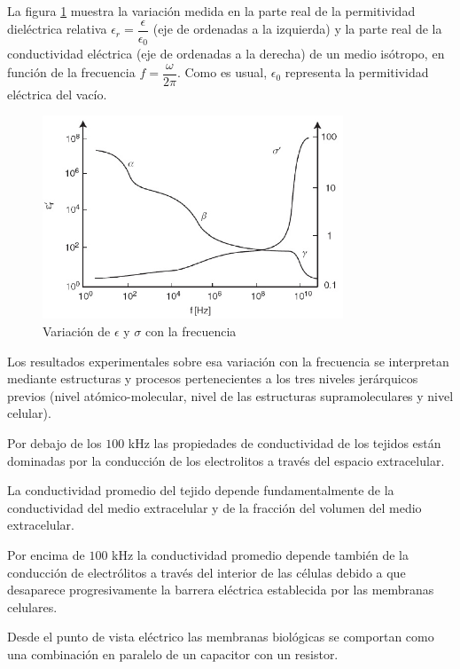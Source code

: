 La figura \ref{fig:65} muestra la variación medida en la parte real de la permitividad dieléctrica relativa $\epsilon_{r}=\dfrac{\epsilon}{\epsilon_{0}}$ (eje de ordenadas a la izquierda) y la parte real de la conductividad eléctrica (eje de ordenadas a la derecha) de un medio isótropo, en función de la frecuencia $f=\dfrac{\omega}{2\pi}$. Como es usual, $\epsilon_{0}$ representa la permitividad eléctrica del vacío.

\begin{figure}[H]
    \centering
    \includegraphics[width=0.8\textwidth]{./Figures/fig65}
	\caption{Variación de $\epsilon$ y $\sigma$ con la frecuencia}
	\label{fig:65}
\end{figure}

Los resultados experimentales sobre esa variación con la frecuencia se interpretan mediante estructuras y procesos pertenecientes a los tres niveles jerárquicos previos (nivel atómico-molecular, nivel de las estructuras supramoleculares y nivel celular).

Por debajo de los $100$ kHz las propiedades de conductividad de los tejidos están dominadas por la conducción de los electrolitos a través del espacio extracelular.

La conductividad promedio del tejido depende fundamentalmente de la conductividad del medio extracelular y de la fracción del volumen del medio extracelular.

Por encima de $100$ kHz la conductividad promedio depende también de la conducción de electrólitos a través del interior de las células debido a que desaparece progresivamente la barrera eléctrica establecida por las membranas celulares.

Desde el punto de vista eléctrico las membranas biológicas se comportan como una combinación en paralelo de un capacitor con un resistor.

